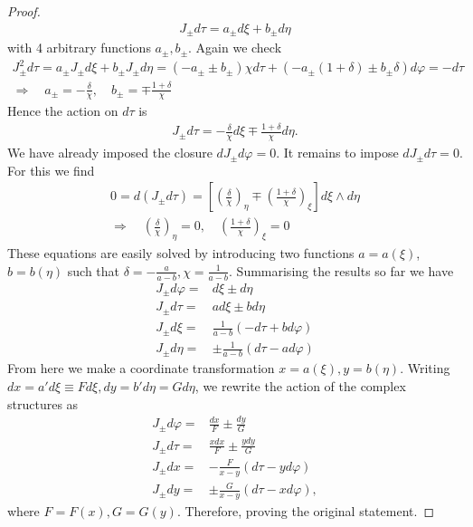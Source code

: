 \documentclass[10pt]{report}
\theoremstyle{definition}
\begin{document}
\begin{proof}
\begin{align}
    J_\pm d\tau = a_\pm d\xi + b_\pm d\eta \nonumber
\end{align}
with 4 arbitrary functions $a_\pm, b_\pm$. Again we check
\begin{gather}
    J_\pm^2 d\tau = a_\pm J_\pm d\xi + b_\pm J_\pm d\eta = \left( -a_\pm  \pm b_\pm \right) \chi d\tau +  \left( - a_\pm (1+ \delta) \pm b_\pm  \delta\right) d\varphi= -d\tau \nonumber \\
    \Rightarrow \quad a_\pm = -\frac{\delta}{\chi}, \quad b_\pm = \mp \frac{1+\delta}{\chi}
\end{gather}
Hence the action on $d\tau$ is 
\begin{gather}
    J_\pm d\tau = - \frac{\delta}{\chi} d\xi \mp \frac{1+\delta}{\chi} d\eta.
\end{gather}
We have already imposed the closure $d J_\pm d\varphi=0$. It remains to impose $d J_\pm d\tau=0$. For this we find
\begin{gather}
  0=  d(J_\pm d\tau) = \left[ \left( \frac{\delta}{\chi} \right)_\eta \mp \left( \frac{1+\delta}{\chi} \right)_\xi \right] d\xi \wedge d\eta \nonumber \\
    \Rightarrow \quad \left( \frac{\delta}{\chi} \right)_\eta = 0, \quad \left( \frac{1+\delta}{\chi} \right)_\xi = 0
\end{gather}
These equations are easily solved by introducing two functions $a = a(\xi)$, $b = b(\eta)$ such that $\delta = -\frac{a}{a-b}, \chi = \frac{1}{a-b}$.
Summarising the results so far we have
\begin{align}
    J_\pm d\varphi =& d\xi \pm d\eta \nonumber \\
    J_\pm d\tau =& a d\xi \pm b d\eta \nonumber \\
    J_\pm d\xi =& \frac{1}{a-b} \left( - d\tau + b d\varphi \right) \nonumber \\
    J_\pm d\eta =& \pm\frac{1}{a-b}\left(  d\tau -a d\varphi \right)
\end{align}
From here we make a coordinate transformation $x = a(\xi), y = b(\eta)$. Writing $dx = a' d\xi \equiv F d\xi, dy = b' d\eta= G d\eta$, 
we rewrite the action of the complex structures as
\begin{align}
    J_\pm d\varphi =& \frac{dx}{F} \pm \frac{dy}{G} \nonumber \\
    J_\pm d\tau =& \frac{x dx}{F} \pm \frac{y dy}{G} \nonumber \\
    J_\pm dx =& - \frac{F}{x-y}\left(  d\tau - y d\varphi \right) \nonumber \\
    J_\pm dy =& \pm \frac{G}{x-y}\left(  d\tau - x d\varphi\right),
\end{align}
where $F=F(x), G=G(y)$. Therefore, proving the original statement.
\end{proof}
\end{document}
